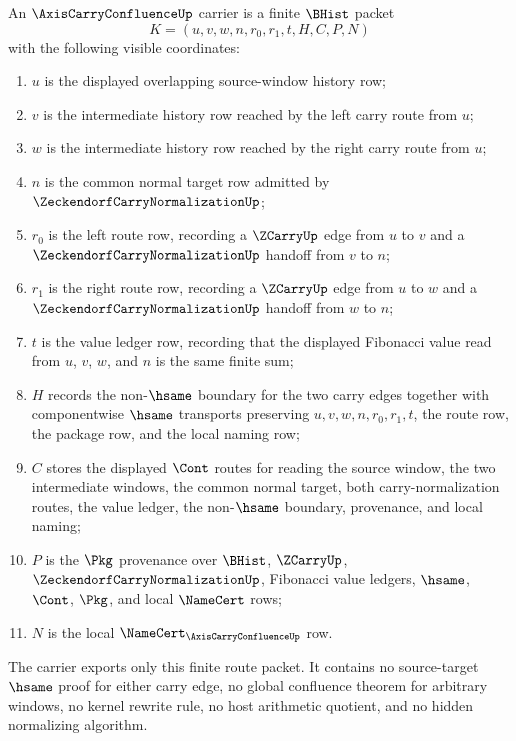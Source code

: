 \begin{definition}
\label{def:axis-carry-confluence-carrier}
An $\AxisCarryConfluenceUp$ carrier is a finite $\BHist$ packet
$$
K=(u,v,w,n,r_0,r_1,t,H,C,P,N)
$$
with the following visible coordinates:
\begin{enumerate}
\item $u$ is the displayed overlapping source-window history row;
\item $v$ is the intermediate history row reached by the left carry route from $u$;
\item $w$ is the intermediate history row reached by the right carry route from $u$;
\item $n$ is the common normal target row admitted by $\ZeckendorfCarryNormalizationUp$;
\item $r_0$ is the left route row, recording a $\ZCarryUp$ edge from $u$ to $v$ and a $\ZeckendorfCarryNormalizationUp$ handoff from $v$ to $n$;
\item $r_1$ is the right route row, recording a $\ZCarryUp$ edge from $u$ to $w$ and a $\ZeckendorfCarryNormalizationUp$ handoff from $w$ to $n$;
\item $t$ is the value ledger row, recording that the displayed Fibonacci value read from $u$, $v$, $w$, and $n$ is the same finite sum;
\item $H$ records the non-$\hsame$ boundary for the two carry edges together with componentwise $\hsame$ transports preserving $u,v,w,n,r_0,r_1,t$, the route row, the package row, and the local naming row;
\item $C$ stores the displayed $\Cont$ routes for reading the source window, the two intermediate windows, the common normal target, both carry-normalization routes, the value ledger, the non-$\hsame$ boundary, provenance, and local naming;
\item $P$ is the $\Pkg$ provenance over $\BHist$, $\ZCarryUp$, $\ZeckendorfCarryNormalizationUp$, Fibonacci value ledgers, $\hsame$, $\Cont$, $\Pkg$, and local $\NameCert$ rows;
\item $N$ is the local $\NameCert_{\AxisCarryConfluenceUp}$ row.
\end{enumerate}
The carrier exports only this finite route packet. It contains no source-target $\hsame$ proof for either carry edge, no global confluence theorem for arbitrary windows, no kernel rewrite rule, no host arithmetic quotient, and no hidden normalizing algorithm.
\end{definition}

